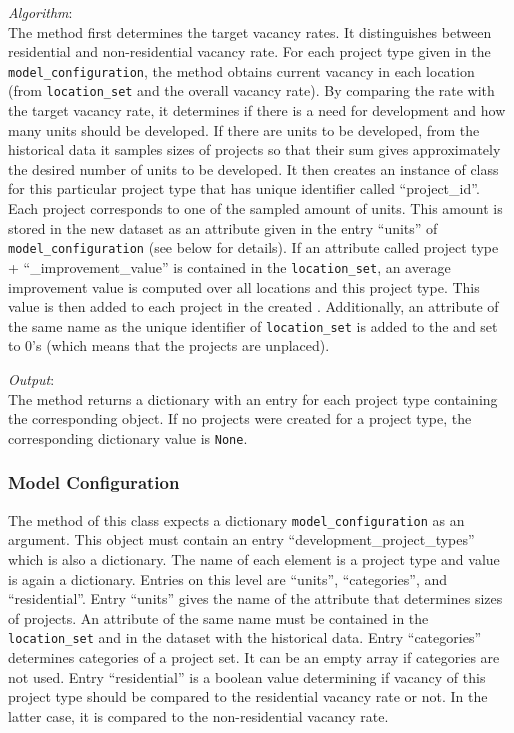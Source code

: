 {\it Algorithm}:~\\[1mm]
The method first determines the target vacancy rates. It distinguishes between
residential and non-residential vacancy rate.  For each project type given in
the \verb|model_configuration|, \modelsindex the method obtains current vacancy in each
location (from \verb|location_set| and the overall vacancy rate). By comparing
the rate with the target vacancy rate, it determines if there is a need for
development and how many units should be developed. If there are units to be
developed, from the historical data it samples sizes of projects so that their
sum gives approximately the desired number of units to be developed. It then
creates an instance of class  for this particular
project type that has unique identifier called ``project_id''. Each project
corresponds to one of the sampled amount of units. This amount is stored in
the new dataset \datasetindex as an attribute given in the entry ``units'' of
\verb|model_configuration| \modelsindex (see below for details). If an attribute \attributesindex called
project type + ``_improvement_value'' is contained in the \verb|location_set|,
an average improvement value is computed over all locations and this project
type. This value is then added to each project in the created
.  Additionally, an attribute \attributesindex of the same name as
the unique identifier of \verb|location_set| is added to the
 and set to 0's (which means that the projects
are unplaced).

{\it Output}:~\\[1mm]
The method returns a dictionary with an entry for each project type containing
the corresponding  object. If no projects were
created for a project type, the corresponding dictionary value is \verb|None|.


\subsubsection{Model Configuration}
\label{sec:DPTM-configuration}
\modelsindex
The  method of this class expects a dictionary
\verb|model_configuration| \modelsindex as an argument. This object must contain an entry
``development_project_types'' which is also a dictionary. The name of each
element is a project type and value is again a dictionary. Entries on this
level are ``units'', ``categories'', and ``residential''. Entry ``units''
gives the name of the attribute \attributesindex that determines sizes of projects. An
attribute \attributesindex of the same name must be contained in the \verb|location_set| and in
the dataset \datasetindex with the historical data. Entry ``categories'' determines
categories of a project set. It can be an empty array if categories are not
used. Entry ``residential'' is a boolean value determining if vacancy of this
project type should be compared to the residential vacancy rate or not. In the
latter case, it is compared to the non-residential vacancy rate.


